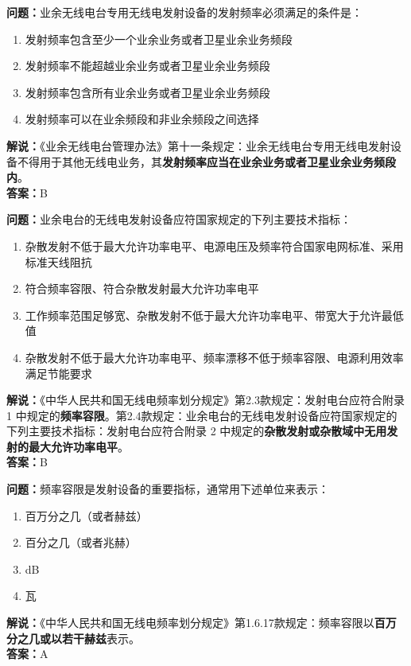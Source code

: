 \bigskip


\noindent\textbf{问题：}业余无线电台专用无线电发射设备的发射频率必须满足的条件是：
\begin{enumerate}[label=\Alph*), leftmargin=3em]
	\item 发射频率包含至少一个业余业务或者卫星业余业务频段
	\item 发射频率不能超越业余业务或者卫星业余业务频段
	\item 发射频率包含所有业余业务或者卫星业余业务频段
	\item 发射频率可以在业余频段和非业余频段之间选择
\end{enumerate}
\noindent\textbf{解说：}《业余无线电台管理办法》第十一条规定：业余无线电台专用无线电发射设备不得用于其他无线电业务，其\textbf{发射频率应当在业余业务或者卫星业余业务频段内}。\\\noindent\textbf{答案：}B


\bigskip


\noindent\textbf{问题：}业余电台的无线电发射设备应符国家规定的下列主要技术指标：
\begin{enumerate}[label=\Alph*), leftmargin=3em]
	\item 杂散发射不低于最大允许功率电平、电源电压及频率符合国家电网标准、采用标准天线阻抗
	\item 符合频率容限、符合杂散发射最大允许功率电平
	\item 工作频率范围足够宽、杂散发射不低于最大允许功率电平、带宽大于允许最低值
	\item 杂散发射不低于最大允许功率电平、频率漂移不低于频率容限、电源利用效率满足节能要求
\end{enumerate}
\noindent\textbf{解说：}《中华人民共和国无线电频率划分规定》第2.3款规定：发射电台应符合附录 1 中规定的\textbf{频率容限}。第2.4款规定：业余电台的无线电发射设备应符国家规定的下列主要技术指标：发射电台应符合附录 2 中规定的\textbf{杂散发射或杂散域中无用发射的最大允许功率电平}。\\\noindent\textbf{答案：}B



\bigskip


\noindent\textbf{问题：}频率容限是发射设备的重要指标，通常用下述单位来表示：
\begin{enumerate}[label=\Alph*), leftmargin=3em]
	\item 百万分之几（或者赫兹）
	\item 百分之几（或者兆赫）
	\item dB
	\item 瓦
\end{enumerate}
\noindent\textbf{解说：}《中华人民共和国无线电频率划分规定》第1.6.17款规定：频率容限以\textbf{百万分之几或以若干赫兹}表示。\\\noindent\textbf{答案：}A


